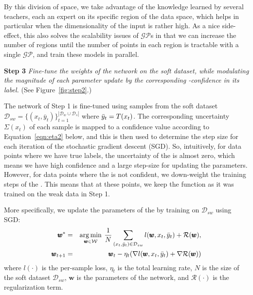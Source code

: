 By this division of space, we take advantage of the knowledge learned by several teachers, each an expert on its specific region of the data space, which helps in particular when the dimensionality of the input is rather high. As a nice side-effect, this also solves the scalability issues of $\mathcal{GP}$s in that we can increase the number of regions until the number of points in each region is tractable with a single $\mathcal{GP}$, and train these models in parallel. 


%
\textbf{Step 3} \emph{Fine-tune the weights of the \std network on the soft dataset, while modulating the magnitude of each parameter update by the corresponding \tch-confidence in its label.} (See Figure~\ref{fig:step2}.)

The \std network of Step 1 is fine-tuned using samples from the soft dataset $\mathcal{D}_{sw}=\{(x_t,\bar{y}_t)\}_{t=1}^{|\mathcal{D}_w \cup \mathcal{D}_s|}$ where $\bar{y}_t=T(x_t)$.
The corresponding uncertainty $\Sigma(x_t)$ of each sample is mapped to a confidence value according to Equation~\ref{eqn:eta2} below, and this is then used to determine the step size for each iteration of the stochastic gradient descent (SGD). So, intuitively, for data points where we have true labels, the uncertainty of the \tch is almost zero, which means we have high confidence and a large step-size for updating the parameters. However, for data points where the \tch is not confident, we down-weight the training steps of the \std. This means that at these points, we keep the \std function as it was trained on the weak data in Step 1.

More specifically, we update the parameters of the \std by training on $\mathcal{D}_{sw}$ using SGD:
\begin{eqnarray*}
  \pmb{w}^* &=& \operatorname*{arg\,min}_{\pmb{w} \in \mathcal{W}} \> \frac{1}{N}\sum_{(x_t,\bar{y}_t) \in \mathcal{D}_{sw}}l(\pmb{w}, x_t, \bar{y}_t) + \mathcal{R}(\pmb{w}), \\
  \pmb{w}_{t+1} &=& \pmb{w}_t - \eta_t(\nabla l(\pmb{w},x_t,\bar{y}_t) + \nabla \mathcal{R}(\pmb{w}))
\end{eqnarray*}
where $l(\cdot)$ is the per-sample loss, $\eta_t$ is the total learning rate, $N$ is the size of the soft dataset $\mathcal{D}_{sw}$, $\pmb{w}$ is the parameters of the \std network, and $\mathcal{R(\cdot)}$ is the regularization term. %

